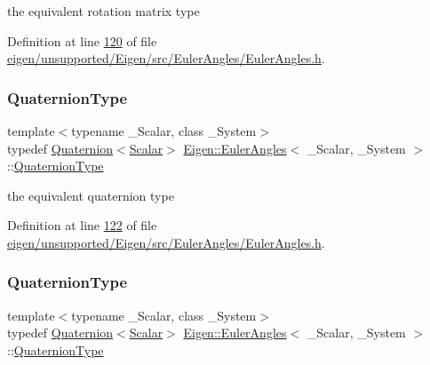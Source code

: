 the equivalent rotation matrix type 

Definition at line \hyperlink{eigen_2unsupported_2_eigen_2src_2_euler_angles_2_euler_angles_8h_source_l00120}{120} of file \hyperlink{eigen_2unsupported_2_eigen_2src_2_euler_angles_2_euler_angles_8h_source}{eigen/unsupported/\+Eigen/src/\+Euler\+Angles/\+Euler\+Angles.\+h}.

\mbox{\label{class_eigen_1_1_euler_angles_adf351608cad15e660279f7323e516d3a}} 
\subsubsection{\texorpdfstring{Quaternion\+Type}{QuaternionType}\hspace{0.1cm}{\footnotesize\ttfamily [1/2]}}
{\footnotesize\ttfamily template$<$typename \+\_\+\+Scalar, class \+\_\+\+System$>$ \\
typedef \hyperlink{group___geometry___module_class_eigen_1_1_quaternion}{Quaternion}$<$\hyperlink{class_eigen_1_1_euler_angles_a2ab1d433ac9683268446f8905ac31aac}{Scalar}$>$ \hyperlink{class_eigen_1_1_euler_angles}{Eigen\+::\+Euler\+Angles}$<$ \+\_\+\+Scalar, \+\_\+\+System $>$\+::\hyperlink{class_eigen_1_1_euler_angles_adf351608cad15e660279f7323e516d3a}{Quaternion\+Type}}

the equivalent quaternion type 

Definition at line \hyperlink{eigen_2unsupported_2_eigen_2src_2_euler_angles_2_euler_angles_8h_source_l00122}{122} of file \hyperlink{eigen_2unsupported_2_eigen_2src_2_euler_angles_2_euler_angles_8h_source}{eigen/unsupported/\+Eigen/src/\+Euler\+Angles/\+Euler\+Angles.\+h}.

\mbox{\label{class_eigen_1_1_euler_angles_adf351608cad15e660279f7323e516d3a}} 
\subsubsection{\texorpdfstring{Quaternion\+Type}{QuaternionType}\hspace{0.1cm}{\footnotesize\ttfamily [2/2]}}
{\footnotesize\ttfamily template$<$typename \+\_\+\+Scalar, class \+\_\+\+System$>$ \\
typedef \hyperlink{group___geometry___module_class_eigen_1_1_quaternion}{Quaternion}$<$\hyperlink{class_eigen_1_1_euler_angles_a2ab1d433ac9683268446f8905ac31aac}{Scalar}$>$ \hyperlink{class_eigen_1_1_euler_angles}{Eigen\+::\+Euler\+Angles}$<$ \+\_\+\+Scalar, \+\_\+\+System $>$\+::\hyperlink{class_eigen_1_1_euler_angles_adf351608cad15e660279f7323e516d3a}{Quaternion\+Type}}

